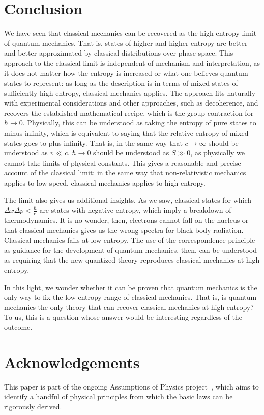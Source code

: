 \documentclass{SciPost}
\begin{document}
\section{Conclusion}

We have seen that classical mechanics can be recovered as the high-entropy limit of quantum mechanics. That is, states of higher and higher entropy are better and better approximated by classical distributions over phase space. This approach to the classical limit is independent of mechanism and interpretation, as it does not matter how the entropy is increased or what one believes quantum states to represent: as long as the description is in terms of mixed states of sufficiently high entropy, classical mechanics applies. The approach fits naturally with experimental considerations and other approaches, such as decoherence, and recovers the established mathematical recipe, which is the group contraction for $\hbar \to 0$. Physically, this can be understood as taking the entropy of pure states to minus infinity, which is equivalent to saying that the relative entropy of mixed states goes to plus infinity. That is, in the same way that $c \to \infty$ should be understood as $v \ll c$, $\hbar \to 0$ should be understood as $S \gg 0$, as physically we cannot take limits of physical constants. This gives a reasonable and precise account of the classical limit: in the same way that non-relativistic mechanics applies to low speed, classical mechanics applies to high entropy.

The limit also gives us additional insights. As we saw, classical states for which $\Delta x \Delta p < \frac{\hbar}{e}$ are states with negative entropy, which imply a breakdown of thermodynamics. It is no wonder, then, electrons cannot fall on the nucleus or that classical mechanics gives us the wrong spectra for black-body radiation. Classical mechanics fails at low entropy. The use of the correspondence principle as guidance for the development of quantum mechanics, then, can be understood as requiring that the new quantized theory reproduces classical mechanics at high entropy. 

In this light, we wonder whether it can be proven that quantum mechanics is the only way to fix the low-entropy range of classical mechanics. That is, is quantum mechanics the only theory that can recover classical mechanics at high entropy? To us, this is a question whose answer would be interesting regardless of the outcome.


\section*{Acknowledgements}
This paper is part of the ongoing Assumptions of Physics project~\cite{aop-book}, which aims to identify a handful of physical principles from which the basic laws can be rigorously derived.
\end{document}

